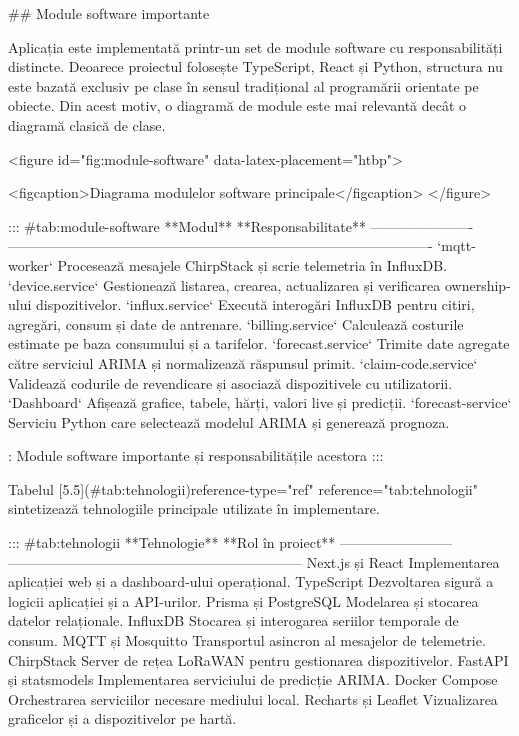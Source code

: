 ## Module software importante

Aplicația este implementată printr-un set de module software cu
responsabilități distincte. Deoarece proiectul folosește TypeScript,
React și Python, structura nu este bazată exclusiv pe clase în sensul
tradițional al programării orientate pe obiecte. Din acest motiv, o
diagramă de module este mai relevantă decât o diagramă clasică de clase.

<figure id="fig:module-software" data-latex-placement="htbp">

<figcaption>Diagrama modulelor software principale</figcaption>
</figure>

::: {#tab:module-software}
  **Modul**              **Responsabilitate**
  ---------------------- -------------------------------------------------------------------------------------------
  `mqtt-worker`          Procesează mesajele ChirpStack și scrie telemetria în InfluxDB.
  `device.service`       Gestionează listarea, crearea, actualizarea și verificarea ownership-ului dispozitivelor.
  `influx.service`       Execută interogări InfluxDB pentru citiri, agregări, consum și date de antrenare.
  `billing.service`      Calculează costurile estimate pe baza consumului și a tarifelor.
  `forecast.service`     Trimite date agregate către serviciul ARIMA și normalizează răspunsul primit.
  `claim-code.service`   Validează codurile de revendicare și asociază dispozitivele cu utilizatorii.
  `Dashboard`            Afișează grafice, tabele, hărți, valori live și predicții.
  `forecast-service`     Serviciu Python care selectează modelul ARIMA și generează prognoza.

  : Module software importante și responsabilitățile acestora
:::

Tabelul [5.5](#tab:tehnologii){reference-type="ref"
reference="tab:tehnologii"} sintetizează tehnologiile principale
utilizate în implementare.

::: {#tab:tehnologii}
  **Tehnologie**           **Rol în proiect**
  ------------------------ ---------------------------------------------------------------
  Next.js și React         Implementarea aplicației web și a dashboard-ului operațional.
  TypeScript               Dezvoltarea sigură a logicii aplicației și a API-urilor.
  Prisma și PostgreSQL     Modelarea și stocarea datelor relaționale.
  InfluxDB                 Stocarea și interogarea seriilor temporale de consum.
  MQTT și Mosquitto        Transportul asincron al mesajelor de telemetrie.
  ChirpStack               Server de rețea LoRaWAN pentru gestionarea dispozitivelor.
  FastAPI și statsmodels   Implementarea serviciului de predicție ARIMA.
  Docker Compose           Orchestrarea serviciilor necesare mediului local.
  Recharts și Leaflet      Vizualizarea graficelor și a dispozitivelor pe hartă.

